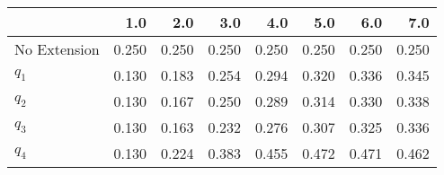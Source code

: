 \begin{tabular}{lrrrrrrr}
\toprule
{} &   1.0 &   2.0 &   3.0 &   4.0 &   5.0 &   6.0 &   7.0 \\
\midrule
No Extension & 0.250 & 0.250 & 0.250 & 0.250 & 0.250 & 0.250 & 0.250 \\
$q_1$        & 0.130 & 0.183 & 0.254 & 0.294 & 0.320 & 0.336 & 0.345 \\
$q_2$        & 0.130 & 0.167 & 0.250 & 0.289 & 0.314 & 0.330 & 0.338 \\
$q_3$        & 0.130 & 0.163 & 0.232 & 0.276 & 0.307 & 0.325 & 0.336 \\
$q_4$        & 0.130 & 0.224 & 0.383 & 0.455 & 0.472 & 0.471 & 0.462 \\
\bottomrule
\end{tabular}
